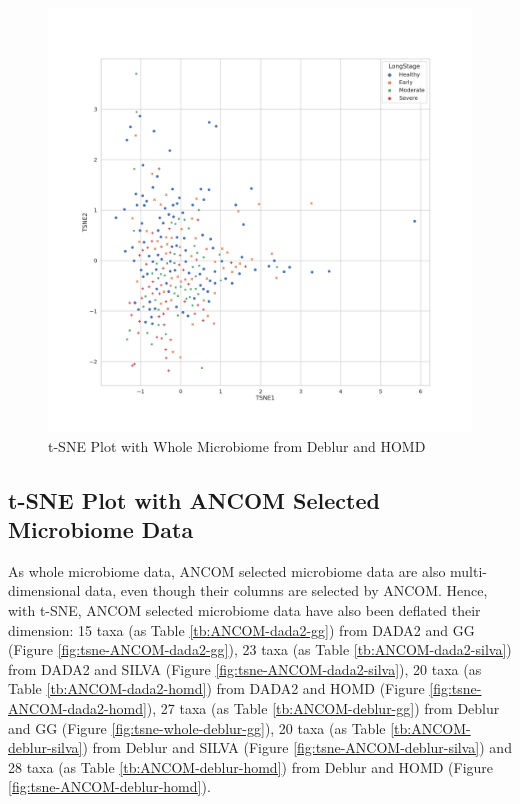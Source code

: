 \documentclass[a4paper]{article}
\begin{document}
            \begin{figure}[p]
                \centering
                \includegraphics[width=0.6 \linewidth]{figures/tSNE/Whole/whole.Deblur.homd.png}
                \caption{t-SNE Plot with Whole Microbiome from Deblur and HOMD}
                \label{fig:tsne-whole-deblur-homd}
            \end{figure}

        \subsection{t-SNE Plot with ANCOM Selected Microbiome Data}
            As whole microbiome data, ANCOM selected microbiome data are also multi-dimensional data, even though their columns are selected by ANCOM. Hence, with t-SNE, ANCOM selected microbiome data have also been deflated their dimension: 15 taxa (as Table \ref{tb:ANCOM-dada2-gg}) from DADA2 and GG (Figure \ref{fig:tsne-ANCOM-dada2-gg}), 23 taxa (as Table \ref{tb:ANCOM-dada2-silva}) from DADA2 and SILVA (Figure \ref{fig:tsne-ANCOM-dada2-silva}), 20 taxa (as Table \ref{tb:ANCOM-dada2-homd}) from DADA2 and HOMD (Figure \ref{fig:tsne-ANCOM-dada2-homd}), 27 taxa (as Table \ref{tb:ANCOM-deblur-gg}) from Deblur and GG (Figure \ref{fig:tsne-whole-deblur-gg}), 20 taxa (as Table \ref{tb:ANCOM-deblur-silva}) from Deblur and SILVA (Figure \ref{fig:tsne-ANCOM-deblur-silva}) and 28 taxa (as Table \ref{tb:ANCOM-deblur-homd}) from Deblur and HOMD (Figure \ref{fig:tsne-ANCOM-deblur-homd}).
\end{document}
